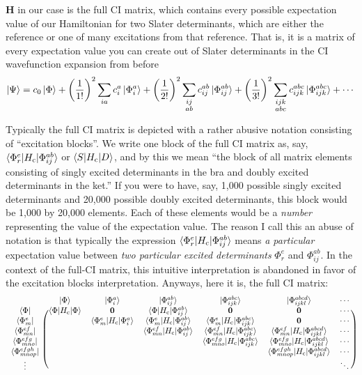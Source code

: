\documentclass{article}
\newcommand{\Hc}{H_{\mathrm{c}}}
\begin{document}
$\mathbf{H}$ in our case is the full CI matrix, which contains every possible expectation value of our Hamiltonian 
for two Slater determinants, which are either the reference or one of many excitations from that reference. 
That is, it is a matrix of every expectation value you can create out of Slater determinants in the CI wavefunction expansion from before
\[ \ket{\Psi} = c_0 \ket{\Phi} + \left(\frac{1}{1!}\right)^2 \sum_{ia} c_i^a \ket{\Phi_i^a} +  \left(\frac{1}{2!}\right)^2\sum_{ \substack{ij \\ ab}} c_{ij}^{ab} \ket{\Phi_{ij}^{ab}} + \left(\frac{1}{3!}\right)^2 \sum_{ \substack{ijk \\ abc}} c_{ijk}^{abc} \ket{\Phi_{ijk}^{abc}} + \cdots \]

Typically the full CI matrix is depicted with a rather abusive notation consisting of ``excitation blocks''. 
We write one block of the full CI matrix as, say, $\braket{\Phi_{r}^{e}|\Hc|\Phi_{ij}^{ab}}$ or $\braket{S|\Hc|D}$, and 
by this we mean ``the block of all matrix elements consisting of singly excited determinants in the bra and doubly excited determinants in the ket.'' 
If you were to have, say, 1,000 possible singly excited determinants and 20,000 possible doubly excited determinants,
this block would be 1,000 by 20,000 elements. Each of these elements would be a \textit{number} representing the value of the expectation value.
The reason I call this an abuse of notation is that typically the expression $\braket{\Phi_{r}^{e}|\Hc|\Phi_{ij}^{ab}}$ means \textit{a particular} 
expectation value between \textit{two particular excited determinants} $\Phi_{r}^{e}$ and  $\Phi_{ij}^{ab}$.
In the context of the full-CI matrix, this intuitive interpretation is abandoned in favor of the excitation blocks interpretation.
Anyways, here it is, the full CI matrix:
\[
\begin{blockarray}{ccccccc}
 & 	\ket{\Phi} & \ket{\Phi_{i}^{a}} & \ket{\Phi_{ij}^{ab}}  &\ket{\Phi_{ijk}^{abc}} & \ket{\Phi_{ijkl}^{abcd}} & \cdots \\
\begin{block}{c(cccccc)}
\bra{\Phi}               & \braket{\Phi|\Hc|\Phi} &  \mathbf{0} &  \braket{\Phi|\Hc|\Phi_{ij}^{ab}} & \mathbf{0} & \mathbf{0} & \cdots  \\
\bra{\Phi_{m}^{e}}       &   &  \braket{\Phi_{m}^{e}|\Hc|\Phi_{i}^{a}} &  \braket{\Phi_{m}^{e}|\Hc|\Phi_{ij}^{ab}} & \braket{\Phi_{m}^{e}|\Hc|\Phi_{ijk}^{abc}} & \mathbf{0} & \cdots \\
\bra{\Phi_{mn}^{ef}}     &   &   &  \braket{\Phi_{mn}^{ef}|\Hc|\Phi_{ij}^{ab}} & \braket{\Phi_{mn}^{ef}|\Hc|\Phi_{ijk}^{abc}}  & \braket{\Phi_{mn}^{ef}|\Hc|\Phi_{ijkl}^{abcd}}  & \cdots \\
\bra{\Phi_{mno}^{efg}}   &   &   &   & \braket{\Phi_{mno}^{efg}|\Hc|\Phi_{ijk}^{abc}} & \braket{\Phi_{mno}^{efg}|\Hc|\Phi_{ijkl}^{abcd}}  & \cdots \\
\bra{\Phi_{mnop}^{efgh}} &   &   &   &   &  \braket{\Phi_{mnop}^{efgh}|\Hc|\Phi_{ijkl}^{abcd}}  & \cdots \\
\vdots                   &   &   &   &   &   & \ddots \\
\end{block}
\end{blockarray}
\]
\end{document}
